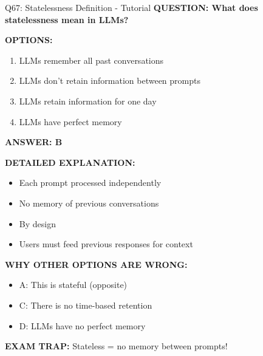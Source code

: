 \documentclass[8pt]{beamer}
\begin{document}
	\begin{frame}{Q67: Statelessness Definition - Tutorial}
		\fontsize{6.5}{7.5}\selectfont
		\textbf{QUESTION: What does statelessness mean in LLMs?}
		
		\vspace{0.1cm}
		\textbf{OPTIONS:}
		\begin{enumerate}
			\item LLMs remember all past conversations
			\item LLMs don't retain information between prompts
			\item LLMs retain information for one day
			\item LLMs have perfect memory
		\end{enumerate}
		
		\vspace{0.1cm}
		\textcolor{myblue}{\textbf{ANSWER: B}}
		
		\vspace{0.1cm}
		\textbf{DETAILED EXPLANATION:}
		\begin{itemize}
			\item Each prompt processed independently
			\item No memory of previous conversations
			\item By design
			\item Users must feed previous responses for context
		\end{itemize}
		
		\vspace{0.1cm}
		\textcolor{myred}{\textbf{WHY OTHER OPTIONS ARE WRONG:}}
		\begin{itemize}
			\item \textcolor{myred}{A:} This is stateful (opposite)
			\item \textcolor{myred}{C:} There is no time-based retention
			\item \textcolor{myred}{D:} LLMs have no perfect memory
		\end{itemize}
		
		\textcolor{myred}{\textbf{EXAM TRAP:}} Stateless = \textcolor{myblue}{no memory between prompts}!
	\end{frame}
	
\end{document}
